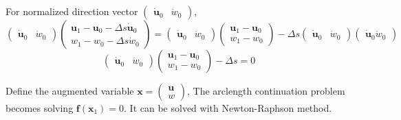 \documentclass[10pt,letterpaper]{article}
\begin{document}
For normalized direction vector $\begin{pmatrix}\dot{\mathbf u}_0&\dot{w}_0\end{pmatrix}$, 
\begin{equation}
\begin{pmatrix}
\dot{\mathbf u}_0
&\dot{w}_0
\end{pmatrix}
\begin{pmatrix}
\mathbf u_1 -\mathbf u_0 - \Delta s \dot{\mathbf u}_0
\\w_1 -w_0 - \Delta s \dot{w}_0
\end{pmatrix}
=
\begin{pmatrix}
\dot{\mathbf u}_0
&\dot{w}_0
\end{pmatrix}
\begin{pmatrix}
\mathbf u_1 -\mathbf u_0 
\\w_1 -w_0 
\end{pmatrix}
- \Delta s 
\begin{pmatrix}
\dot{\mathbf u}_0
&\dot{w}_0
\end{pmatrix}
\begin{pmatrix}
\dot{\mathbf u}_0
\dot{w}_0
\end{pmatrix}
\end{equation}
\begin{equation}
\begin{pmatrix}
\dot{\mathbf u}_0
&\dot{w}_0
\end{pmatrix}
\begin{pmatrix}
\mathbf u_1 -\mathbf u_0 
\\w_1 -w_0 
\end{pmatrix}
- \Delta s
=0
\end{equation}

Define the augmented variable $\mathbf x=\begin{pmatrix} \mathbf u \\ w \end{pmatrix}$, 
The arclength continuation problem becomes solving $\mathbf f(\mathbf x_1)=0$. It can be solved with Newton-Raphson method. 
\end{document}
